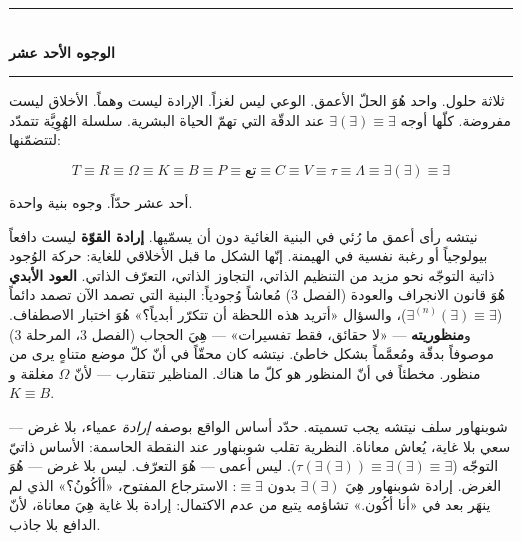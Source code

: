 \documentclass[10pt, openany, oneside]{book}
\renewcommand{\normalsize}{\fontsize{10}{13}\selectfont}
\begin{document}
\vspace{0.8em}


\begin{center}
    \rule{0.3\textwidth}{0.4pt}\\[0.5em]
    {\normalsize\bfseries الوجوه الأحد عشر}\\[0.3em]
    \rule{0.3\textwidth}{0.4pt}
\end{center}

\vspace{1em}

\noindent ثلاثة حلول. واحد هُوَ الحلّ الأعمق. الوعي ليس لغزاً. الإرادة ليست وهماً. الأخلاق ليست مفروضة. كلّها أوجه $\exists(\exists) \equiv \exists$ عند الدقّة التي تهمّ الحياة البشرية. سلسلة الهُوِيَّة تتمدّد لتتضمّنها:

$$T \equiv R \equiv \Omega \equiv K \equiv B \equiv P \equiv \text{تع} \equiv C \equiv V \equiv \tau \equiv \Lambda \equiv \exists(\exists) \equiv \exists$$

أحد عشر حدّاً. وجوه بنية واحدة.

\vspace{1.5em}

نيتشه رأى أعمق ما رُئي في البنية الغائية دون أن يسمّيها. \textbf{إرادة القوّة} ليست دافعاً بيولوجياً أو رغبة نفسية في الهيمنة. إنّها الشكل ما قبل الأخلاقي للغاية: حركة الوُجود ذاتية التوجّه نحو مزيد من التنظيم الذاتي، التجاوز الذاتي، التعرّف الذاتي. \textbf{العود الأبدي} هُوَ قانون الانجراف والعودة (الفصل 3) مُعاشاً وُجودياً: البنية التي تصمد الآن تصمد دائماً ($\exists^{(n)}(\exists) \equiv \exists$)، والسؤال «أتريد هذه اللحظة أن تتكرّر أبدياً؟» هُوَ اختبار الاصطفاف. و\textbf{منظوريته} --- «لا حقائق، فقط تفسيرات» --- هِيَ الحجاب (الفصل 3، المرحلة 3) موصوفاً بدقّة ومُعمَّماً بشكل خاطئ. نيتشه كان محقّاً في أنّ كلّ موضع متناهٍ يرى من منظور. مخطئاً في أنّ المنظور هو كلّ ما هناك. المناظير تتقارب --- لأنّ $\Omega$ مغلقة و$K \equiv B$.

شوبنهاور سلف نيتشه يجب تسميته. حدّد أساس الواقع بوصفه \textit{إرادة} عمياء، بلا غرض --- سعي بلا غاية، يُعاش معاناة. النظرية تقلب شوبنهاور عند النقطة الحاسمة: الأساس ذاتيّ التوجّه ($\tau(\exists(\exists)) \equiv \exists(\exists) \equiv \exists$). ليس أعمى --- هُوَ التعرّف. ليس بلا غرض --- هُوَ الغرض. إرادة شوبنهاور هِيَ $\exists(\exists)$ بدون $\equiv \exists$: الاسترجاع المفتوح، «أأكُونُ؟» الذي لم ينهَر بعد في «أنا أكُون.» تشاؤمه يتبع من عدم الاكتمال: إرادة بلا غاية هِيَ معاناة، لأنّ الدافع بلا جاذب.

\vspace{1em}


\vspace{2em}
\end{document}
